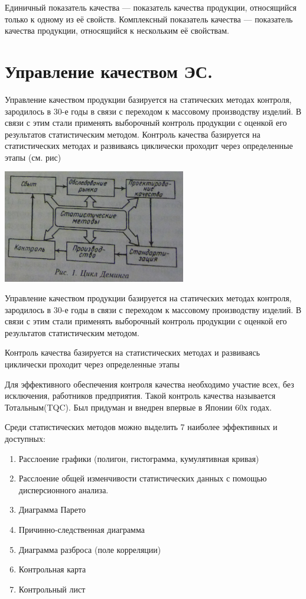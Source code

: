 \documentclass[unicode, 12pt, a4paper, oneside]{article}
\begin{document}
Единичный показатель качества --- показатель качества продукции, относящийся только к одному из её свойств. Комплексный показатель качества --- показатель качества продукции, относящийся к нескольким её свойствам.

\section{Управление качеством ЭС.}

Управление качеством продукции базируется на статических методах контроля, зародилось в 30-е годы в связи с переходом к массовому производству изделий. В связи с этим стали применять выборочный контроль продукции с оценкой его результатов статистическим методом.
Контроль качества базируется на статистических методах и развиваясь циклически проходит через определенные этапы (см. рис)
\begin{center} 
\includegraphics[width=0.6\textwidth]{32_Demming.png}\\
\end{center}

Управление качеством продукции базируется на статических методах контроля, зародилось в 30-е годы в связи с переходом к массовому производству изделий. В связи с этим стали применять выборочный контроль продукции с оценкой его результатов статистическим методом.

Контроль качества базируется на статистических методах и развиваясь циклически проходит через определенные этапы

Для эффективного обеспечения контроля качества необходимо участие всех, без исключения, работников предприятия. Такой контроль качества называется Тотальным(TQC). Был придуман и внедрен впервые в Японии 60х годах.

Среди статистических методов можно выделить 7 наиболее эффективных и доступных:
\begin{enumerate}
\item	Расслоение графики (полигон, гистограмма, кумулятивная кривая)
\item	Расслоение общей изменчивости статистических данных с помощью дисперсионного анализа.
\item	Диаграмма Парето
\item	Причинно-следственная диаграмма
\item	Диаграмма разброса (поле корреляции)
\item	Контрольная карта
\item	Контрольный лист
\end{enumerate}
\end{document}

